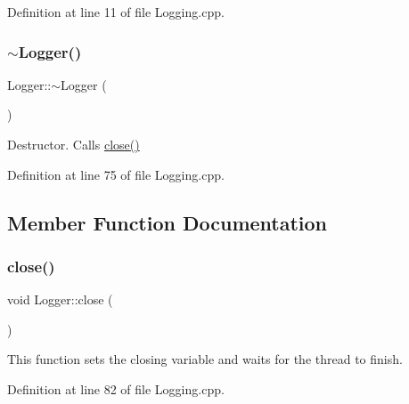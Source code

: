 Definition at line 11 of file Logging.\+cpp.

\mbox{\label{class_world_architect_1_1_logger_acb668a9e186a25fbaad2e4af6d1ed00a}} 
\subsubsection{\texorpdfstring{$\sim$Logger()}{~Logger()}}
{\footnotesize\ttfamily Logger\+::$\sim$\+Logger (\begin{DoxyParamCaption}{ }\end{DoxyParamCaption})}



Destructor. Calls \mbox{\hyperlink{class_world_architect_1_1_logger_afee2bab560c2db0190c980884d33868c}{close()}} 



Definition at line 75 of file Logging.\+cpp.



\subsection{Member Function Documentation}
\mbox{\label{class_world_architect_1_1_logger_afee2bab560c2db0190c980884d33868c}} 
\subsubsection{\texorpdfstring{close()}{close()}}
{\footnotesize\ttfamily void Logger\+::close (\begin{DoxyParamCaption}{ }\end{DoxyParamCaption})}



This function sets the closing variable and waits for the thread to finish. 



Definition at line 82 of file Logging.\+cpp.

\mbox{\label{class_world_architect_1_1_logger_a9baaacdb933276d67f4e1d7c213ceda0}} 
